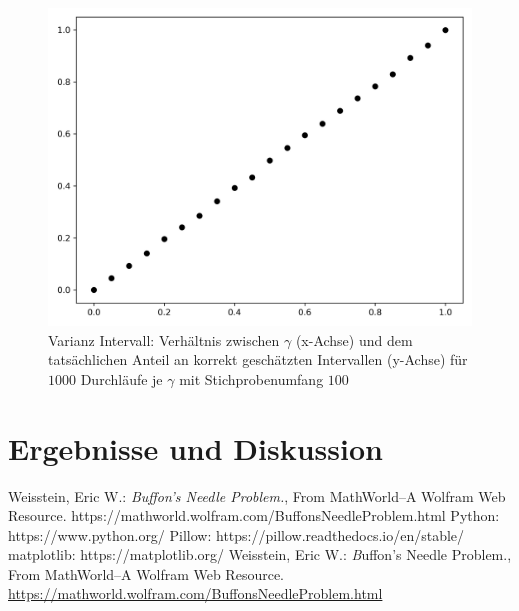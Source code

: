 \documentclass[10pt,twocolumn]{scrartcl}
\begin{document}
		\begin{figure}[H]
			\centering
			\includegraphics[width=0.9\columnwidth]{images/var_interval.png}
			\caption{Varianz Intervall: Verhältnis zwischen $\gamma$ (x-Achse) und dem tatsächlichen Anteil an korrekt geschätzten Intervallen (y-Achse) für $1000$ Durchläufe je $\gamma$ mit Stichprobenumfang $100$}
			\label{fig_var_interval_dot}
		\end{figure}


\section*{Ergebnisse und Diskussion}

\begin{thebibliography}{99}
	Weisstein, Eric W.: {\it Buffon's Needle Problem.}, From MathWorld--A Wolfram Web Resource. https://mathworld.wolfram.com/BuffonsNeedleProblem.html
	Python: https://www.python.org/
	Pillow: https://pillow.readthedocs.io/en/stable/
	matplotlib: https://matplotlib.org/
	Weisstein, Eric W.: {\textit Buffon's Needle Problem.}, From MathWorld--A Wolfram Web Resource. \url{https://mathworld.wolfram.com/BuffonsNeedleProblem.html}
\end{thebibliography}
\end{document}
